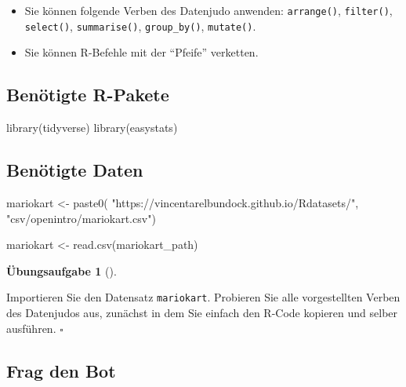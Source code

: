 \documentclass[
  letterpaper,
]{scrbook}
\newenvironment{Shaded}{\begin{snugshade}}{\end{snugshade}}
\newcommand{\FunctionTok}[1]{\textcolor[rgb]{0.28,0.35,0.67}{#1}}
\newcommand{\NormalTok}[1]{\textcolor[rgb]{0.00,0.23,0.31}{#1}}
\newcommand{\OtherTok}[1]{\textcolor[rgb]{0.00,0.23,0.31}{#1}}
\newcommand{\StringTok}[1]{\textcolor[rgb]{0.13,0.47,0.30}{#1}}
\providecommand{\tightlist}{%
  \setlength{\itemsep}{0pt}\setlength{\parskip}{0pt}}\usepackage{longtable,booktabs,array}
\theoremstyle{definition}
\newtheorem{exercise}{Übungsaufgabe}[chapter]
\theoremstyle{definition}
\theoremstyle{definition}
\theoremstyle{remark}
\begin{document}
\begin{itemize}
\tightlist
\item
  Sie können folgende Verben des Datenjudo anwenden: \texttt{arrange()},
  \texttt{filter()}, \texttt{select()}, \texttt{summarise()},
  \texttt{group\_by()}, \texttt{mutate()}.
\item
  Sie können R-Befehle mit der \enquote{Pfeife} verketten.
\end{itemize}

\subsection{Benötigte R-Pakete}\label{benuxf6tigte-r-pakete}

\begin{Shaded}
\begin{Highlighting}[]
\FunctionTok{library}\NormalTok{(tidyverse)}
\FunctionTok{library}\NormalTok{(easystats)}
\end{Highlighting}
\end{Shaded}

\subsection{Benötigte Daten}\label{benuxf6tigte-daten-1}

\begin{Shaded}
\begin{Highlighting}[]
\NormalTok{mariokart }\OtherTok{\textless{}{-}} \FunctionTok{paste0}\NormalTok{(}
  \StringTok{"https://vincentarelbundock.github.io/Rdatasets/"}\NormalTok{,}
  \StringTok{"csv/openintro/mariokart.csv"}\NormalTok{)}

\NormalTok{mariokart }\OtherTok{\textless{}{-}} \FunctionTok{read.csv}\NormalTok{(mariokart\_path)}
\end{Highlighting}
\end{Shaded}

\begin{exercise}[]\protect\hypertarget{exr-los}{}\label{exr-los}

Importieren Sie den Datensatz \texttt{mariokart}. Probieren Sie alle
vorgestellten Verben des Datenjudos aus, zunächst in dem Sie einfach den
R-Code kopieren und selber ausführen. \(\square\)

\end{exercise}

\subsection{Frag den Bot}\label{frag-den-bot}
\end{document}
